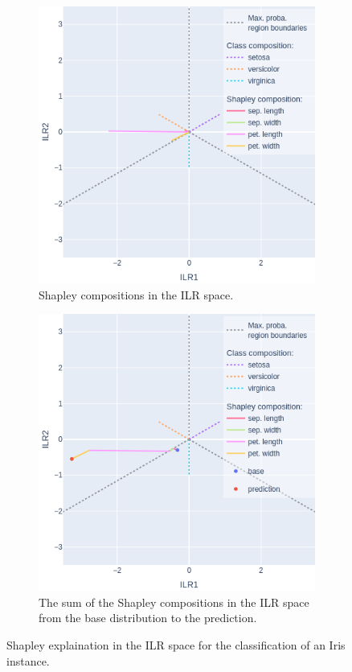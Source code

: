 \documentclass{article}
\theoremstyle{plain}
\theoremstyle{definition}
\theoremstyle{remark}
\begin{document}
\begin{figure}
  \begin{subfigure}{0.5\textwidth}
    \centering
    \includegraphics[width=0.8\linewidth]{figures/3classes/ilrplot.png}
    \caption{Shapley compositions in the ILR space.}
    \label{fig:3classesshap}
  \end{subfigure}
  
\vspace{0.5cm}
  \begin{subfigure}{0.5\textwidth}
    \centering
    \includegraphics[width=0.8\linewidth]{figures/3classes/ilrplotsum.png}
    \caption{The sum of the Shapley compositions in the ILR space from the base distribution to the prediction.}
    \label{fig:3classesshapsum}
  \end{subfigure}
  \caption{Shapley explaination in the ILR space for the classification of an Iris instance.}
  \label{fig:3classes}
\end{figure}
\end{document}
